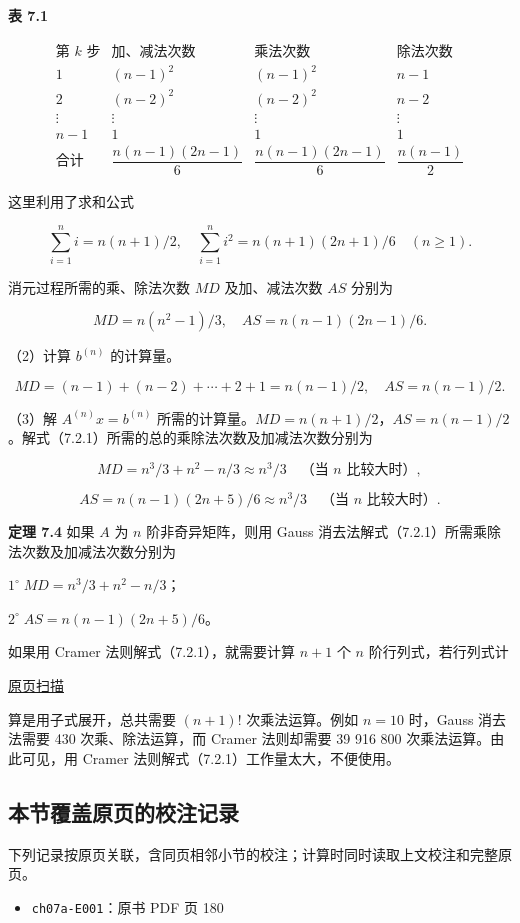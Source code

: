 \documentclass[
  10pt,
  fontset=fandol]{ctexart}
\providecommand{\tightlist}{%
  \setlength{\itemsep}{0pt}\setlength{\parskip}{0pt}}
\begin{document}
\textbf{表 7.1}

\[
\begin{array}{c|c|c|c}
\text{第 }k\text{ 步}&\text{加、减法次数}&\text{乘法次数}&\text{除法次数}\\\hline
1&(n-1)^2&(n-1)^2&n-1\\
2&(n-2)^2&(n-2)^2&n-2\\
\vdots&\vdots&\vdots&\vdots\\
n-1&1&1&1\\\hline
\text{合计}&\dfrac{n(n-1)(2n-1)}{6}&\dfrac{n(n-1)(2n-1)}{6}&\dfrac{n(n-1)}{2}
\end{array}
\]

这里利用了求和公式

\[\sum_{i=1}^{n}i=n(n+1)/2,\quad \sum_{i=1}^{n}i^2=n(n+1)(2n+1)/6\quad(n\ge1).\]

消元过程所需的乘、除法次数 \(MD\) 及加、减法次数 \(AS\) 分别为

\[MD=n(n^2-1)/3,\quad AS=n(n-1)(2n-1)/6.\]

（2）计算 \(b^{(n)}\) 的计算量。

\[MD=(n-1)+(n-2)+\cdots+2+1=n(n-1)/2,\quad AS=n(n-1)/2.\]

（3）解 \(A^{(n)}x=b^{(n)}\) 所需的计算量。\(MD=n(n+1)/2\)，\(AS=n(n-1)/2\)。解式（7.2.1）所需的总的乘除法次数及加减法次数分别为

\[MD=n^3/3+n^2-n/3\approx n^3/3\quad\text{（当 $n$ 比较大时）},\]

\[AS=n(n-1)(2n+5)/6\approx n^3/3\quad\text{（当 $n$ 比较大时）}.\]

\textbf{定理 7.4} 如果 \(A\) 为 \(n\) 阶非奇异矩阵，则用 Gauss 消去法解式（7.2.1）所需乘除法次数及加减法次数分别为

\(1^\circ\;MD=n^3/3+n^2-n/3\)；

\(2^\circ\;AS=n(n-1)(2n+5)/6\)。

如果用 Cramer 法则解式（7.2.1），就需要计算 \(n+1\) 个 \(n\) 阶行列式，若行列式计

\href{../../source-images/pdf-184.jpeg}{原页扫描}

算是用子式展开，总共需要 \((n+1)!\) 次乘法运算。例如 \(n=10\) 时，Gauss 消去法需要 430 次乘、除法运算，而 Cramer 法则却需要 39 916 800 次乘法运算。由此可见，用 Cramer 法则解式（7.2.1）工作量太大，不便使用。

\subsection{本节覆盖原页的校注记录}\label{ux672cux8282ux8986ux76d6ux539fux9875ux7684ux6821ux6ce8ux8bb0ux5f55}

下列记录按原页关联，含同页相邻小节的校注；计算时同时读取上文校注和完整原页。

\begin{itemize}
\tightlist
\item
  \texttt{ch07a-E001}：原书 PDF 页 180
\end{itemize}
\end{document}
